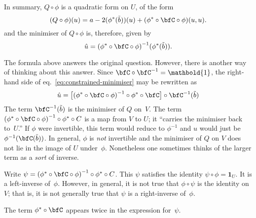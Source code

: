 \documentclass[10pt, a4paper]{article}
\newcommand{\id}{\mathbold{1}}
\begin{document}
In summary, $Q\circ\phi$ is a quadratic form on $U$, of the form
\[
(Q\circ\phi)(u) = a - 2(\phi^*(\tilde{b}))(u) + (\phi^*\circ\bfC\circ\phi)(u, u).
\]
and the minimiser of $Q\circ\phi$ is, therefore, given by
\begin{equation}
\hat{u} = {(\phi^*\circ\bfC\circ\phi)}^{-1}(\phi^*(\tilde{b})).
\label{eq:constrained-minimiser}
\end{equation}

The formula above answers the original question. However, there is
another way of thinking about this answer. Since
$\bfC\circ \bfC^{-1} = \id$, the right-hand side of
eq.~\eqref{eq:constrained-minimiser} may be rewritten as
\[
  \hat{u} = \bigl[{(\phi^*\circ\bfC\circ\phi)}^{-1}\circ\phi^*\circ \bfC\bigr]\circ
  \bfC^{-1}(\tilde{b})
\]
The term $\bfC^{-1}(\tilde{b})$ is the minimiser of $Q$ on~$V$. The
term ${(\phi^*\circ\bfC\circ\phi)}^{-1}\circ\phi^*\circ C$ is a map from
$V$ to $U$; it ``carries the minimiser back to~$U$.'' If $\phi$ were
invertible, this term would reduce to $\phi^{-1}$ and $\hat{u}$ would
just be $\phi^{-1}(\bfC(\tilde{b}))$.  In general, $\phi$ is \emph{not}
invertible and the minimiser of $Q$ on $V$ does not lie in the image
of $U$ under~$\phi$. Nonetheless one sometimes thinks of the larger term
as a \emph{sort} of inverse. 

Write $\psi={(\phi^*\circ\bfC\circ\phi)}^{-1}\circ\phi^*\circ C$. This $\psi$ satisfies the
identity $\psi\circ\phi=\id_U$. It is a left-inverse of~$\phi$. However, in
general, it is not true that $\phi\circ\psi$ is the identity on~$V$; that is, it
is not generally true that $\psi$ is a right-inverse of~$\phi$.

The term $\phi^*\circ \bfC$ appears twice in the expression for~$\psi$. 
\end{document}
